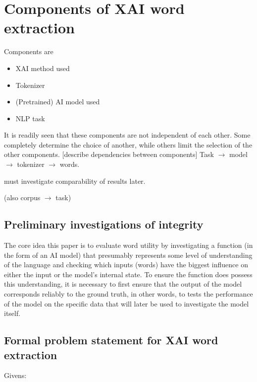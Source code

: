 \section{Components of XAI word extraction}
Components are
\begin{itemize}
	\item XAI method used
	\item Tokenizer
	\item (Pretrained) AI model used
	\item NLP task
\end{itemize}

It is readily seen that these components are not independent of each other.
Some completely determine the choice of another, while others limit the selection of the other components.
	[describe dependencies between components]
Task $\rightarrow$ model $\rightarrow$ tokenizer $\rightarrow$ words.

must investigate comparability of results later.

(also corpus $\rightarrow$ task)
\subsection{Preliminary investigations of integrity}
The core idea this paper is to evaluate word utility by investigating a function (in the form of an AI model) that presumably represents some level of understanding of the language and checking which inputs (words) have the biggest influence on either the input or the model's internal state.
To ensure the function does possess this understanding, it is necessary to first ensure that the output of the model corresponds reliably to the ground truth, in other words, to tests the performance of the model on the specific data that will later be used to investigate the model itself.



\subsection{Formal problem statement for XAI word extraction}

Givens:

